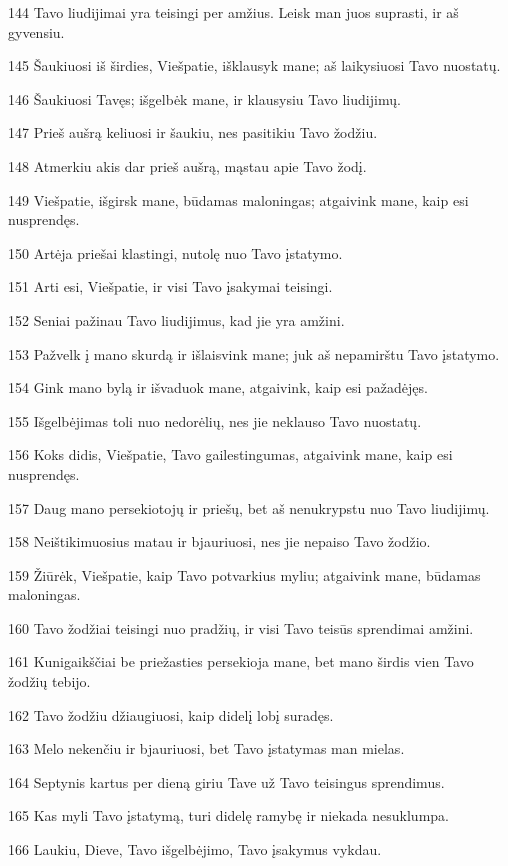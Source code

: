 \par 144 Tavo liudijimai yra teisingi per amžius. Leisk man juos suprasti, ir aš gyvensiu. 
\par 145 Šaukiuosi iš širdies, Viešpatie, išklausyk mane; aš laikysiuosi Tavo nuostatų. 
\par 146 Šaukiuosi Tavęs; išgelbėk mane, ir klausysiu Tavo liudijimų. 
\par 147 Prieš aušrą keliuosi ir šaukiu, nes pasitikiu Tavo žodžiu. 
\par 148 Atmerkiu akis dar prieš aušrą, mąstau apie Tavo žodį. 
\par 149 Viešpatie, išgirsk mane, būdamas maloningas; atgaivink mane, kaip esi nusprendęs. 
\par 150 Artėja priešai klastingi, nutolę nuo Tavo įstatymo. 
\par 151 Arti esi, Viešpatie, ir visi Tavo įsakymai teisingi. 
\par 152 Seniai pažinau Tavo liudijimus, kad jie yra amžini. 
\par 153 Pažvelk į mano skurdą ir išlaisvink mane; juk aš nepamirštu Tavo įstatymo. 
\par 154 Gink mano bylą ir išvaduok mane, atgaivink, kaip esi pažadėjęs. 
\par 155 Išgelbėjimas toli nuo nedorėlių, nes jie neklauso Tavo nuostatų. 
\par 156 Koks didis, Viešpatie, Tavo gailestingumas, atgaivink mane, kaip esi nusprendęs. 
\par 157 Daug mano persekiotojų ir priešų, bet aš nenukrypstu nuo Tavo liudijimų. 
\par 158 Neištikimuosius matau ir bjauriuosi, nes jie nepaiso Tavo žodžio. 
\par 159 Žiūrėk, Viešpatie, kaip Tavo potvarkius myliu; atgaivink mane, būdamas maloningas. 
\par 160 Tavo žodžiai teisingi nuo pradžių, ir visi Tavo teisūs sprendimai amžini. 
\par 161 Kunigaikščiai be priežasties persekioja mane, bet mano širdis vien Tavo žodžių tebijo. 
\par 162 Tavo žodžiu džiaugiuosi, kaip didelį lobį suradęs. 
\par 163 Melo nekenčiu ir bjauriuosi, bet Tavo įstatymas man mielas. 
\par 164 Septynis kartus per dieną giriu Tave už Tavo teisingus sprendimus. 
\par 165 Kas myli Tavo įstatymą, turi didelę ramybę ir niekada nesuklumpa. 
\par 166 Laukiu, Dieve, Tavo išgelbėjimo, Tavo įsakymus vykdau. 
